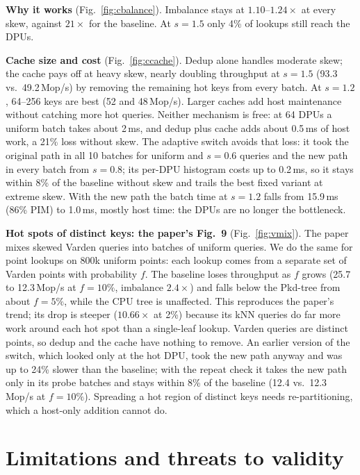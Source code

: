 \documentclass[conference]{IEEEtran}
\begin{document}
\textbf{Why it works} (Fig.~\ref{fig:cbalance}). Imbalance stays at $1.10$--$1.24\times$ at every skew, against
$21\times$ for the baseline. At $s{=}1.5$ only 4\% of lookups still reach the DPUs.

\textbf{Cache size and cost} (Fig.~\ref{fig:ccache}). Dedup alone handles moderate skew; the cache pays off at heavy
skew, nearly doubling throughput at $s{=}1.5$ (93.3 vs.\ 49.2\,Mop/s) by removing the remaining hot keys from every batch.
At $s{=}1.2$, 64--256 keys are best (52 and 48\,Mop/s). Larger caches add host maintenance without catching more hot
queries. Neither mechanism is free: at 64 DPUs a uniform batch takes about 2\,ms, and dedup plus cache adds about
0.5\,ms of host work, a 21\% loss without skew. The adaptive switch avoids that loss: it took the original path in all
10 batches for uniform and $s{=}0.6$ queries and the new path in every batch from $s{=}0.8$; its per-DPU histogram
costs up to 0.2\,ms, so it stays within 8\% of the baseline without skew and trails the best fixed variant at extreme
skew. With the new path the batch time at $s{=}1.2$ falls from 15.9\,ms (86\% PIM) to 1.0\,ms, mostly host time: the
DPUs are no longer the bottleneck.

\textbf{Hot spots of distinct keys: the paper's Fig.~9} (Fig.~\ref{fig:vmix}).
\label{sec:varden9}
The paper mixes skewed Varden queries into batches of uniform queries. We do the same for point lookups on 800k uniform
points: each lookup comes from a separate set of Varden points with probability $f$. The baseline loses throughput as
$f$ grows (25.7 to 12.3\,Mop/s at $f{=}10\%$, imbalance $2.4\times$) and falls below the Pkd-tree from about $f{=}5\%$,
while the CPU tree is unaffected. This reproduces the paper's trend; its drop is steeper ($10.66\times$ at 2\%) because its
kNN queries do far more work around each hot spot than a single-leaf lookup. Varden queries are distinct points, so
dedup and the cache have nothing to remove. An earlier version of the switch, which looked only at the hot DPU, took the
new path anyway and was up to 24\% slower than the baseline; with the repeat check it takes the new path only in its
probe batches and stays within 8\% of the baseline (12.4 vs.\ 12.3\,Mop/s at $f{=}10\%$). Spreading a hot region of
distinct keys needs re-partitioning, which a host-only addition cannot do.



\section{Limitations and threats to validity}
\end{document}
